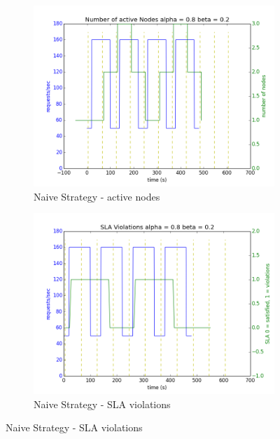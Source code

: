 \documentclass[12pt]{article}
\begin{document}
\begin{figure}[h!]
\begin{subfigure}{.5\textwidth}
\includegraphics[width=\textwidth]{Naive282nodes.png}
\caption{Naive Strategy - active nodes}
\end{subfigure}
\begin{subfigure}{.5\textwidth}
\includegraphics[width=\textwidth]{Naive282SLA.png}
\caption{Naive Strategy - SLA violations}
\end{subfigure}


\end{figure}
\end{document}
